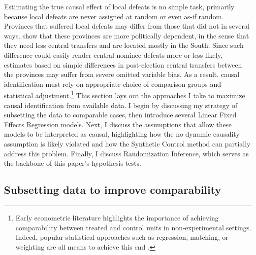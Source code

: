 \documentclass[12pt]{article}\usepackage[]{graphicx}\usepackage[]{color}
\newcommand{\1}{\mathbbm{1}}
\begin{document}
Estimating the true causal effect of local defeats is no simple task, primarily because local defeats are never assigned at random or even as-if random. Provinces that suffered local defeats may differ from those that did not in several ways. \cite{MaleskySchuler2011} show that these provinces are more politically dependent, in the sense that they need less central transfers and are located mostly in the South. Since such difference could easily render central nominee defeats more or less likely, estimates based on simple differences in post-election central transfers between the provinces may suffer from severe omitted variable bias. As a result, causal identification must rely on appropriate choice of comparison groups and statistical adjustment.\footnote{Early econometric literature highlights the importance of achieving comparability between treated and control units in non-experimental settings. Indeed, popular statistical approaches such as regression, matching, or weighting are all means to achieve this end \citep{Ashenfelter1978, AshenfelterCard1985, Lalonde1986, DehejiaWahba1999}.} This section lays out the approaches I take to maximize causal identification from available data. I begin by discussing my strategy of subsetting the data to comparable cases, then introduce several Linear Fixed Effects Regression models. Next, I discuss the assumptions that allow these models to be interpreted as causal, highlighting how the no dynamic causality assumption is likely violated and how the Synthetic Control method can partially address this problem. Finally, I discuss Randomization Inference, which serves as the backbone of this paper's hypothesis tests.

\subsection{Subsetting data to improve comparability}
\label{sec:subset}
\end{document}
